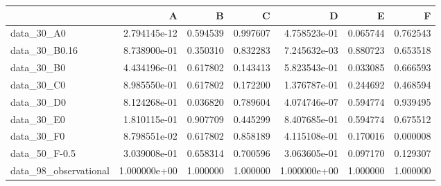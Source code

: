 \begin{tabular}{lrrrrrr}
\toprule
{} &             A &         B &         C &             D &         E &         F \\
\midrule
data\_30\_A0            &  2.794145e-12 &  0.594539 &  0.997607 &  4.758523e-01 &  0.065744 &  0.762543 \\
data\_30\_B0.16         &  8.738900e-01 &  0.350310 &  0.832283 &  7.245632e-03 &  0.880723 &  0.653518 \\
data\_30\_B0            &  4.434196e-01 &  0.617802 &  0.143413 &  5.823543e-01 &  0.033085 &  0.666593 \\
data\_30\_C0            &  8.985550e-01 &  0.617802 &  0.172200 &  1.376787e-01 &  0.244692 &  0.468594 \\
data\_30\_D0            &  8.124268e-01 &  0.036820 &  0.789604 &  4.074746e-07 &  0.594774 &  0.939495 \\
data\_30\_E0            &  1.810115e-01 &  0.907709 &  0.445299 &  8.407685e-01 &  0.594774 &  0.675512 \\
data\_30\_F0            &  8.798551e-02 &  0.617802 &  0.858189 &  4.115108e-01 &  0.170016 &  0.000008 \\
data\_50\_F-0.5         &  3.039008e-01 &  0.658314 &  0.700596 &  3.063605e-01 &  0.097170 &  0.129307 \\
data\_98\_observational &  1.000000e+00 &  1.000000 &  1.000000 &  1.000000e+00 &  1.000000 &  1.000000 \\
\bottomrule
\end{tabular}
